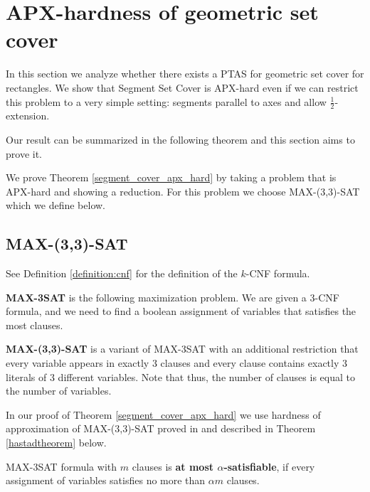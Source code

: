 \chapter{APX-hardness of geometric set cover}
\newcommand{\setCoverInstance}{(\points, \sets)}
\newcommand{\true}{\texttt{true}}
\newcommand{\false}{\texttt{false}}
\newcommand{\opt}{\mathsf{opt}}
\newcommand{\approximate}{\mathsf{approx}}

\label{chapter:segment_apx}

In this section we analyze whether there exists 
a PTAS for geometric set cover for rectangles.
We show that Segment Set Cover
is APX-hard even if we can restrict this problem
to a very simple setting:
segments parallel to axes and allow $\frac{1}{2}$-extension.

Our result can be summarized in the following
theorem and this section aims to prove it.

\segmentCoverApxHard*

We prove Theorem \ref{segment_cover_apx_hard}
by taking a problem that is APX-hard
and showing a reduction.
For this problem we choose
MAX-(3,3)-SAT which we define below.

\section{MAX-(3,3)-SAT}

See Definition \ref{definition:cnf}
for the definition of the $k$-CNF formula.

\begin{defi}
\textbf{MAX-3SAT} is the following maximization problem. We are given a 3-CNF
formula, and we need to find a boolean assignment of variables
that satisfies the most clauses.
\end{defi}

\begin{defi}
\textbf{MAX-(3,3)-SAT} is a variant of MAX-3SAT with an additional
restriction that every variable appears in exactly 3 clauses
and every clause contains exactly 3 literals of 3 different variables.
Note that thus, the number of clauses is equal to the number of variables.
\end{defi}

In our proof of Theorem \ref{segment_cover_apx_hard} we use
hardness of approximation of MAX-(3,3)-SAT proved
in \cite{hastad} and described in
Theorem \ref{hastadtheorem} below.

\begin{defi}
MAX-3SAT formula with $m$ clauses is \textbf{at most $\alpha$-satisfiable}, if
every assignment of variables satisfies no more than $\alpha m$
clauses. 
\end{defi}

